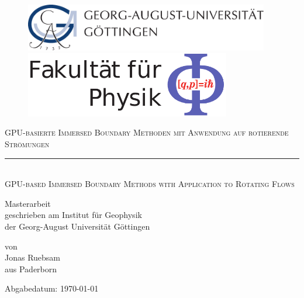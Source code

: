 \documentclass[11pt,a4paper,headsepline,bibliography=totoc,idxtotoc,DIV12,openright,twoside=true,chapterprefix=on]{scrbook}
\begin{document}
\makeatletter
\renewcommand*\env@cases[1][1.2]{%
  \let\@ifnextchar\new@ifnextchar
  \left\lbrace
  \def\arraystretch{#1}%
  \array{@{}l@{\quad}l@{}}%
}
\makeatother

\begin{titlepage}


\begin{figure}[!t]
  \begin{minipage}[l]{0.5\textwidth}
      \includegraphics[width=0.95\textwidth]{gfx/logos/ug.pdf}
  \end{minipage}
  \hfill
  \begin{minipage}[r]{0.4\textwidth}
      \includegraphics[width=0.8\textwidth]{gfx/logos/physik.pdf}
  \end{minipage}
\end{figure}

       \vspace*{1cm}
       \begin{center}
       \begin{huge}
       \textsc{GPU-basierte Immersed Boundary Methoden mit Anwendung auf rotierende Strömungen}
       \rule{0.9\textwidth}{0.4pt}\\
       \textsc{GPU-based Immersed Boundary Methods with Application to Rotating Flows}\\[1.8cm]
       \end{huge}
       \begin{Large}
	Masterarbeit\\[2cm]
	geschrieben am Institut für Geophysik\\
	der Georg-August Universität Göttingen\\[2cm]
       \end{Large}
       \begin{large}
       von\\[.5cm]
       Jonas Ruebsam\\
       aus Paderborn\\
       \vfill
       \begin{center}
        \begin{otherlanguage}{ngerman}
       Abgabedatum: \today
        \end{otherlanguage}
       \end{center}
       \end{large}
     \end{center}
\end{titlepage}
\end{document}

